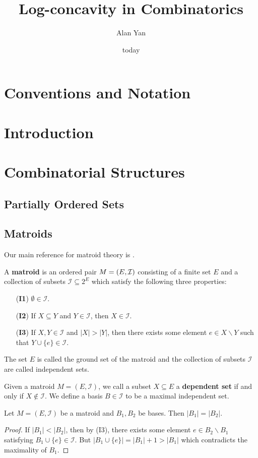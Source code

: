 \documentclass{puthesis-UG}
\author{Alan Yan}
\title{Log-concavity in Combinatorics}
\date{today}
\begin{document}
 
\chapter{Conventions and Notation}

\chapter{Introduction}

\chapter{Combinatorial Structures}

\section{Partially Ordered Sets}

\section{Matroids}

Our main reference for matroid theory is \cite{10.5555/1197093}. 

\begin{defn}
	A \textbf{matroid} is an ordered pair $M = (E, \mathcal{I})$ consisting of a finite set $E$ and a collection of subsets $\mathcal{I} \subseteq 2^E$ which satisfy the following three properties:
	\begin{enumerate}
		\item[(\textbf{I1})] $\emptyset \in \mathcal{I}$.
		\item[(\textbf{I2})] If $X \subseteq Y$ and $Y \in \mathcal{I}$, then $X \in \mathcal{I}$. 
		\item[(\textbf{I3})] If $X, Y \in \mathcal{I}$ and $|X| > |Y|$, then there exists some element $e \in X \backslash Y$ such that $Y \cup \{e\} \in \mathcal{I}$. 
	\end{enumerate}
	The set $E$ is called the ground set of the matroid and the collection of subsets $\mathcal{I}$ are called independent sets. 
\end{defn}

Given a matroid $M = (E, \mathcal{I})$, we call a subset $X \subseteq E$ a \textbf{dependent set} if and only if $X \notin \mathcal{I}$. We define a basis $B \in \mathcal{I}$ to be a maximal independent set. 

\begin{prop}
	Let $M = (E, \mathcal{I})$ be a matroid and $B_1, B_2$ be bases. Then $|B_1| = |B_2|$. 
\end{prop}
\begin{proof}
	If $|B_1| < |B_2|$, then by (I3), there exists some element $e \in B_2 \backslash B_1$ satisfying $B_1 \cup \{e\} \in \mathcal{I}$. But $|B_1 \cup \{e\}| = |B_1| + 1 > |B_1|$ which contradicts the maximality of $B_1$. 
\end{proof}
\end{document}
